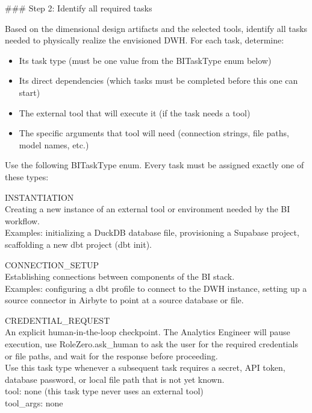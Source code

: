 \#\#\# Step 2: Identify all required tasks
\newline

Based on the dimensional design artifacts and the selected tools, identify all tasks needed to physically realize the envisioned DWH. For each task, determine:
\newline

\begin{itemize}
    \item Its task type (must be one value from the BITaskType enum below)
    \item Its direct dependencies (which tasks must be completed before this one can start)
    \item The external tool that will execute it (if the task needs a tool)
    \item The specific arguments that tool will need (connection strings, file paths, model names, etc.)
\end{itemize}

Use the following BITaskType enum. Every task must be assigned exactly one of these types:
\newline

INSTANTIATION \\
Creating a new instance of an external tool or environment needed by the BI workflow. \\
Examples: initializing a DuckDB database file, provisioning a Supabase project, scaffolding a new dbt project (dbt init).
\newline

CONNECTION\_SETUP \\
Establishing connections between components of the BI stack. \\
Examples: configuring a dbt profile to connect to the DWH instance, setting up a source connector in Airbyte to point at a source database or file.
\newline

CREDENTIAL\_REQUEST \\
An explicit human-in-the-loop checkpoint. The Analytics Engineer will pause execution, use RoleZero.ask\_human to ask the user for the required credentials or file paths, and wait for the response before proceeding. \\
Use this task type whenever a subsequent task requires a secret, API token, database password, or local file path that is not yet known. \\
tool: none (this task type never uses an external tool) \\
tool\_args: none
\newline

